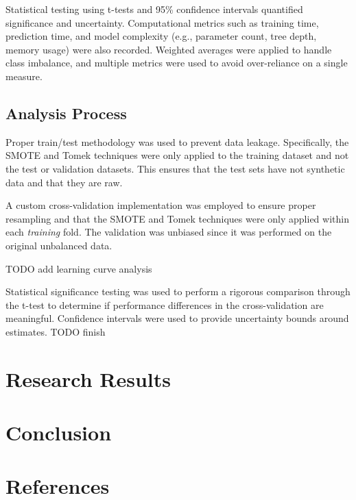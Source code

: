 \documentclass[conference]{IEEEtran}
\begin{document}
Statistical testing using t-tests and 95\% confidence intervals quantified significance and uncertainty. Computational metrics such as training time, prediction time, and model complexity (e.g., parameter count, tree depth, memory usage) were also recorded. Weighted averages were applied to handle class imbalance, and multiple metrics were used to avoid over-reliance on a single measure.

\subsection{Analysis Process}
Proper train/test methodology was used to prevent data leakage. Specifically, the SMOTE and Tomek techniques were only applied to the training dataset and not the test or validation datasets. This ensures that the test sets have not synthetic data and that they are raw.

A custom cross-validation implementation was employed to ensure proper resampling and that the SMOTE and Tomek techniques were only applied within each \textit{training} fold. The validation was unbiased since it was performed on the original unbalanced data.

TODO add learning curve analysis

Statistical significance testing was used to perform a rigorous comparison through the t-test to determine if performance differences in the cross-validation are meaningful. Confidence intervals were used to provide uncertainty bounds around estimates.
TODO finish

\section{Research Results}
\section{Conclusion}
\section*{References}



\end{document}
